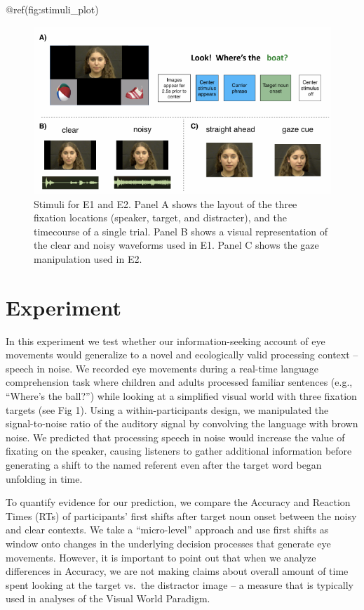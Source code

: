 \documentclass[10pt, letterpaper]{article}
\newenvironment{CodeChunk}{}{}
\begin{document}
@ref(fig:stimuli\_plot)

\begin{CodeChunk}
\begin{figure}[tb]

{\centering \includegraphics[width=0.8\linewidth]{figs/stimuli_plot-1} 

}

\caption[Stimuli for E1 and E2]{Stimuli for E1 and E2. Panel A shows the layout of the three fixation locations (speaker, target, and distracter), and the timecourse of a single trial. Panel B shows a visual representation of the clear and noisy waveforms used in E1. Panel C shows the gaze manipulation used in E2.}\label{fig:stimuli_plot}
\end{figure}
\end{CodeChunk}

\section{Experiment}\label{experiment}

In this experiment we test whether our information-seeking account of
eye movements would generalize to a novel and ecologically valid
processing context -- speech in noise. We recorded eye movements during
a real-time language comprehension task where children and adults
processed familiar sentences (e.g., ``Where's the ball?'') while looking
at a simplified visual world with three fixation targets (see Fig 1).
Using a within-participants design, we manipulated the signal-to-noise
ratio of the auditory signal by convolving the language with brown
noise. We predicted that processing speech in noise would increase the
value of fixating on the speaker, causing listeners to gather additional
information before generating a shift to the named referent even after
the target word began unfolding in time.

To quantify evidence for our prediction, we compare the Accuracy and
Reaction Times (RTs) of participants' first shifts after target noun
onset between the noisy and clear contexts. We take a ``micro-level''
approach and use first shifts as window onto changes in the underlying
decision processes that generate eye movements. However, it is important
to point out that when we analyze differences in Accuracy, we are not
making claims about overall amount of time spent looking at the target
vs.~the distractor image -- a measure that is typically used in analyses
of the Visual World Paradigm.
\end{document}
